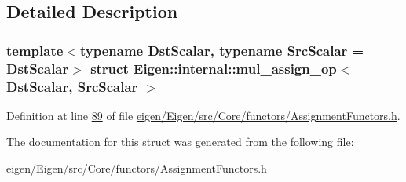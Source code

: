 \subsection{Detailed Description}
\subsubsection*{template$<$typename Dst\+Scalar, typename Src\+Scalar = Dst\+Scalar$>$\newline
struct Eigen\+::internal\+::mul\+\_\+assign\+\_\+op$<$ Dst\+Scalar, Src\+Scalar $>$}



Definition at line \hyperlink{eigen_2_eigen_2src_2_core_2functors_2_assignment_functors_8h_source_l00089}{89} of file \hyperlink{eigen_2_eigen_2src_2_core_2functors_2_assignment_functors_8h_source}{eigen/\+Eigen/src/\+Core/functors/\+Assignment\+Functors.\+h}.



The documentation for this struct was generated from the following file\+:\begin{DoxyCompactItemize}
\item 
eigen/\+Eigen/src/\+Core/functors/\+Assignment\+Functors.\+h\end{DoxyCompactItemize}
